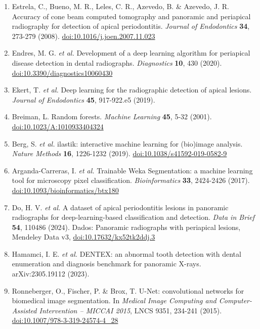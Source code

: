 \documentclass[twocolumn]{article}
\begin{document}
{\sffamily\fontsize{7.8pt}{10.2pt}\selectfont
\begin{enumerate}[leftmargin=5mm,itemsep=1mm]
\item Estrela, C., Bueno, M. R., Leles, C. R., Azevedo, B. \& Azevedo, J. R. Accuracy of cone beam computed tomography and panoramic and periapical radiography for detection of apical periodontitis. \textit{Journal of Endodontics} \textbf{34}, 273-279 (2008). \href{https://doi.org/10.1016/j.joen.2007.11.023}{doi:10.1016/j.joen.2007.11.023}
\item Endres, M. G. \textit{et al.} Development of a deep learning algorithm for periapical disease detection in dental radiographs. \textit{Diagnostics} \textbf{10}, 430 (2020). \href{https://doi.org/10.3390/diagnostics10060430}{doi:10.3390/diagnostics10060430}
\item Ekert, T. \textit{et al.} Deep learning for the radiographic detection of apical lesions. \textit{Journal of Endodontics} \textbf{45}, 917-922.e5 (2019).
\item Breiman, L. Random forests. \textit{Machine Learning} \textbf{45}, 5-32 (2001). \href{https://doi.org/10.1023/A:1010933404324}{doi:10.1023/A:1010933404324}
\item Berg, S. \textit{et al.} ilastik: interactive machine learning for (bio)image analysis. \textit{Nature Methods} \textbf{16}, 1226-1232 (2019). \href{https://doi.org/10.1038/s41592-019-0582-9}{doi:10.1038/s41592-019-0582-9}
\item Arganda-Carreras, I. \textit{et al.} Trainable Weka Segmentation: a machine learning tool for microscopy pixel classification. \textit{Bioinformatics} \textbf{33}, 2424-2426 (2017). \href{https://doi.org/10.1093/bioinformatics/btx180}{doi:10.1093/bioinformatics/btx180}
\item Do, H. V. \textit{et al.} A dataset of apical periodontitis lesions in panoramic radiographs for deep-learning-based classification and detection. \textit{Data in Brief} \textbf{54}, 110486 (2024). Dados: Panoramic radiographs with periapical lesions, Mendeley Data v3, \href{https://doi.org/10.17632/kx52tk2ddj.3}{doi:10.17632/kx52tk2ddj.3}
\item Hamamci, I. E. \textit{et al.} DENTEX: an abnormal tooth detection with dental enumeration and diagnosis benchmark for panoramic X-rays. arXiv:2305.19112 (2023).
\item Ronneberger, O., Fischer, P. \& Brox, T. U-Net: convolutional networks for biomedical image segmentation. In \textit{Medical Image Computing and Computer-Assisted Intervention -- MICCAI 2015}, LNCS 9351, 234-241 (2015). \href{https://doi.org/10.1007/978-3-319-24574-4_28}{doi:10.1007/978-3-319-24574-4\_28}

\end{enumerate}}
\end{document}
